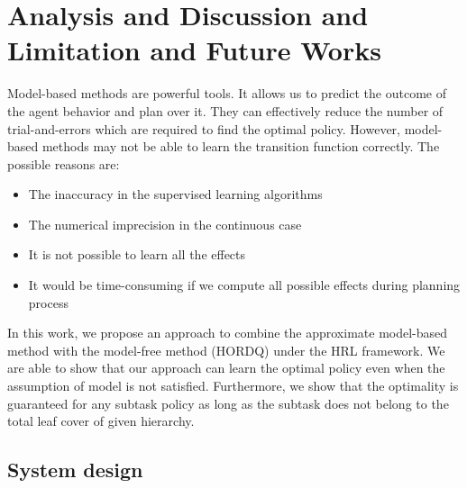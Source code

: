\chapter{Analysis and Discussion and Limitation and Future Works}


Model-based methods are powerful tools. It allows us to predict the outcome 
of the agent behavior and plan over it. They can effectively reduce the number of 
trial-and-errors which are required to find the optimal policy.
However, model-based methods may not be able to learn the transition function correctly.
The possible reasons are:
\begin{itemize}
\item The inaccuracy in the supervised learning algorithms
\item The numerical imprecision in the continuous case
\item It is not possible to learn all the effects
\item It would be time-consuming if we compute all possible effects during planning process
\end{itemize}

In this work, we propose an approach to combine the approximate model-based method with the
model-free method (HORDQ) under the HRL framework. We are able to show that our approach
can learn the optimal policy even when the assumption of model is not satisfied. Furthermore, we show that the optimality
is guaranteed for any subtask policy as long as the subtask does not belong to the total leaf
cover of given hierarchy.

\section{System design}

